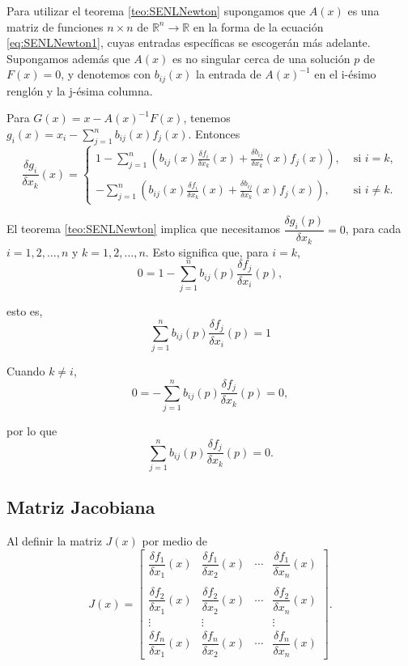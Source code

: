 Para utilizar el teorema \ref{teo:SENLNewton} supongamos que $A(x)$ es una matriz de funciones $n\times n$ de $\mathbb{R}^n\rightarrow \mathbb{R}$ 
en la forma de la ecuación \ref{eq:SENLNewton1}, cuyas entradas específicas se escogerán más adelante. Supongamos además que $A(x)$ es no singular 
cerca de una solución $p$ de $F(x)=0$, y denotemos con $b_{ij}(x)$ la entrada de $A(x)^{-1}$ en el i-ésimo renglón y la j-ésima columna.

Para $G(x) = x - A(x)^{-1}F(x)$, tenemos $g_i(x) = x_i - \sum_{j=1}^n b_{ij}(x)f_j(x)$. Entonces 
\begin{equation*}
	\frac{\delta g_i}{\delta x_k}(x) = \left\{
		\begin{array}{lc}
			1 - \displaystyle{\sum_{j=1}^n \left( b_{ij}(x)\frac{\delta f_i}{\delta x_k}(x) + \frac{\delta b_{ij}}{\delta x_k}(x) f_j(x) \right)}, 
			& \mbox{ si } i=k,\\
			  & \\
			-\displaystyle{\sum_{j=1}^n}\left( b_{ij}(x)\frac{\delta f_i}{\delta x_k}(x) + \frac{\delta b_{ij}}{\delta x_k}(x) f_j(x) \right), 
			& \mbox{ si } i\not=k.
		\end{array}	
	\right.
\end{equation*}

El teorema \ref{teo:SENLNewton} implica que necesitamos $\dfrac{\delta g_i(p)}{\delta x_k} = 0$, para cada $i=1,2,\dots,n$ y $k=1,2,\dots,n$. 
Esto significa que, para $i=k$,
\begin{equation*}
  0 = 1 - \sum_{j=1}^n b_{ij}(p)\frac{\delta f_j}{\delta x_i}(p),
\end{equation*}

esto es,
\begin{equation}
	\sum_{j=1}^n b_{ij}(p)\dfrac{\delta f_j}{\delta x_i}(p) = 1
	\label{eq:SENLNewton2}
\end{equation}
	
Cuando $k\not=i$,
\[
	0 = -\sum_{j=1}^n b_{ij}(p) \dfrac{\delta f_j}{\delta x_k}(p) = 0,
\]

por lo que
\begin{equation}
	\sum_{j=1}^n b_{ij}(p)\dfrac{\delta f_j}{\delta x_k}(p) = 0.
	\label{eq:SENLNewton3}
\end{equation}

\subsection*{Matriz Jacobiana}

Al definir la matriz $J(x)$ por medio de
\[
	J(x) = 
	\left[
	\begin{matrix}
		\dfrac{\delta f_1}{\delta x_1}(x) & \dfrac{\delta f_1}{\delta x_2}(x) & \cdots & \dfrac{\delta f_1}{\delta x_n}(x) \\\\
		\dfrac{\delta f_2}{\delta x_1}(x) & \dfrac{\delta f_2}{\delta x_2}(x) & \cdots & \dfrac{\delta f_2}{\delta x_n}(x) \\
		\vdots & \vdots & & \vdots \\
		\dfrac{\delta f_n}{\delta x_1}(x) & \dfrac{\delta f_n}{\delta x_2}(x) & \cdots & \dfrac{\delta f_n}{\delta x_n}(x)
	\end{matrix}
	\right].
\]

